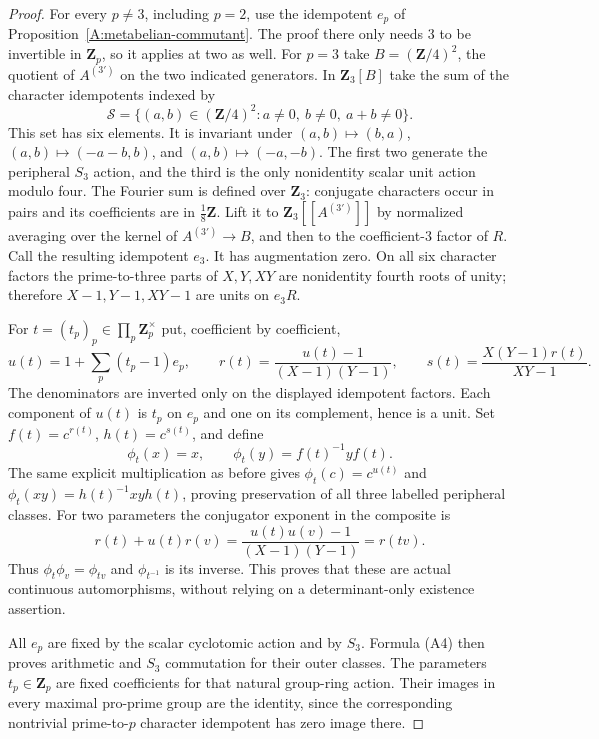 \documentclass[11pt,oneside]{article}
\begin{document}
\begin{proof}
For every $p\ne3$, including $p=2$, use the idempotent
$e_p$ of Proposition~\ref{A:metabelian-commutant}.
The proof there only needs $3$ to be invertible in
$\mathbf Z_p$, so it applies at two as well. For $p=3$
take $B=(\mathbf Z/4)^2$, the quotient of $A^{(3')}$
on the two indicated generators. In $\mathbf Z_3[B]$
take the sum of the character idempotents indexed by
\[
 \mathcal S=\{(a,b)\in(\mathbf Z/4)^2:
                     a\ne0,\ b\ne0,\ a+b\ne0\}.
\]
This set has six elements. It is invariant under
$(a,b)\mapsto(b,a)$, $(a,b)\mapsto(-a-b,b)$, and
$(a,b)\mapsto(-a,-b)$. The first two generate the
peripheral $S_3$ action, and the third is the only
nonidentity scalar unit action modulo four. The Fourier
sum is defined over $\mathbf Z_3$: conjugate characters
occur in pairs and its coefficients are in
$\frac18\mathbf Z$. Lift it to
$\mathbf Z_3[[A^{(3')}]]$ by normalized averaging over
the kernel of $A^{(3')}\to B$, and then to the
coefficient-$3$ factor of $R$. Call the resulting
idempotent $e_3$. It has augmentation zero. On all
six character factors the prime-to-three parts of
$X,Y,XY$ are nonidentity fourth roots of unity;
therefore $X-1,Y-1,XY-1$ are units on $e_3R$.

For $t=(t_p)_p\in\prod_p\mathbf Z_p^\times$ put,
coefficient by coefficient,
\[
 u(t)=1+\sum_p(t_p-1)e_p,\qquad
 r(t)=\frac{u(t)-1}{(X-1)(Y-1)},\qquad
 s(t)=\frac{X(Y-1)r(t)}{XY-1}.
\]
The denominators are inverted only on the displayed
idempotent factors. Each component of $u(t)$ is $t_p$
on $e_p$ and one on its complement, hence is a unit.
Set $f(t)=c^{r(t)}$, $h(t)=c^{s(t)}$, and define
\[
 \phi_t(x)=x,\qquad \phi_t(y)=f(t)^{-1}yf(t).
\]
The same explicit multiplication as before gives
$\phi_t(c)=c^{u(t)}$ and
$\phi_t(xy)=h(t)^{-1}xyh(t)$, proving preservation
of all three labelled peripheral classes. For two
parameters the conjugator exponent in the composite is
\[
 r(t)+u(t)r(v)=\frac{u(t)u(v)-1}{(X-1)(Y-1)}=r(tv).
\]
Thus $\phi_t\phi_v=\phi_{tv}$ and
$\phi_{t^{-1}}$ is its inverse. This proves that these
are actual continuous automorphisms, without relying
on a determinant-only existence assertion.

All $e_p$ are fixed by the scalar cyclotomic action and
by $S_3$. Formula (A4) then proves arithmetic and
$S_3$ commutation for their outer classes. The
parameters $t_p\in\mathbf Z_p$ are fixed coefficients
for that natural group-ring action. Their images in
every maximal pro-prime group are the identity, since
the corresponding nontrivial prime-to-$p$ character
idempotent has zero image there.


\end{proof}
\end{document}
